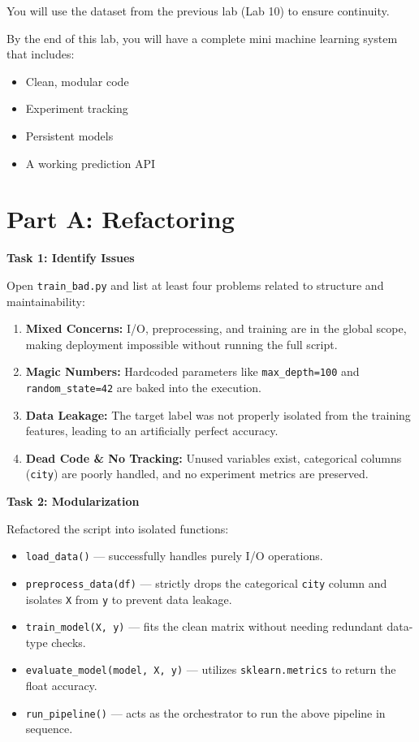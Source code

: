 \documentclass[12pt,a4paper]{article}
\begin{document}
You will use the dataset from the previous lab (Lab 10) to ensure continuity.

By the end of this lab, you will have a complete mini machine learning system that includes:
\begin{itemize}
\item Clean, modular code
\item Experiment tracking
\item Persistent models
\item A working prediction API
\end{itemize}

\section*{Part A: Refactoring}

\begin{tcolorbox}
\textbf{Task 1: Identify Issues}

Open \texttt{train\_bad.py} and list at least four problems related to structure and maintainability:
\begin{enumerate}
    \item \textbf{Mixed Concerns:} I/O, preprocessing, and training are in the global scope, making deployment impossible without running the full script.
    \item \textbf{Magic Numbers:} Hardcoded parameters like \texttt{max\_depth=100} and \texttt{random\_state=42} are baked into the execution.
    \item \textbf{Data Leakage:} The target label was not properly isolated from the training features, leading to an artificially perfect accuracy.
    \item \textbf{Dead Code \& No Tracking:} Unused variables exist, categorical columns (\texttt{city}) are poorly handled, and no experiment metrics are preserved.
\end{enumerate}
\end{tcolorbox}

\vspace{6pt}

\begin{tcolorbox}
\textbf{Task 2: Modularization}

Refactored the script into isolated functions:
\begin{itemize}
  \item \texttt{load\_data()} — successfully handles purely I/O operations.
  \item \texttt{preprocess\_data(df)} — strictly drops the categorical \texttt{city} column and isolates \texttt{X} from \texttt{y} to prevent data leakage.
  \item \texttt{train\_model(X, y)} — fits the clean matrix without needing redundant data-type checks.
  \item \texttt{evaluate\_model(model, X, y)} — utilizes \texttt{sklearn.metrics} to return the float accuracy.
  \item \texttt{run\_pipeline()} — acts as the orchestrator to run the above pipeline in sequence.
\end{itemize}
\end{tcolorbox}
\end{document}
